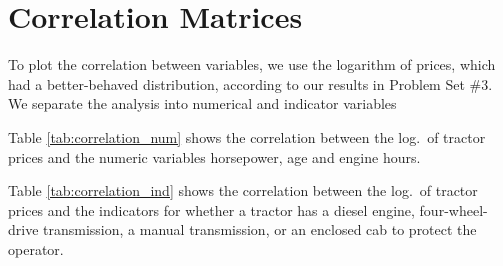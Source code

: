 \documentclass[11pt]{article}
\begin{document}








\pagebreak
\section{Correlation Matrices}
To plot the correlation between variables, 
we use the logarithm of prices, which had a better-behaved distribution, 
according to our results in Problem Set \#3.
We separate the analysis into numerical and indicator variables 


Table \ref{tab:correlation_num} shows the correlation 
between the log.~of tractor prices
and the numeric variables horsepower, age and engine hours.





Table \ref{tab:correlation_ind} shows the correlation 
between the log.~of tractor prices
and the indicators for whether a tractor
has a diesel engine, four-wheel-drive transmission, a manual transmission, 
or an enclosed cab to protect the operator. 





\end{document}
